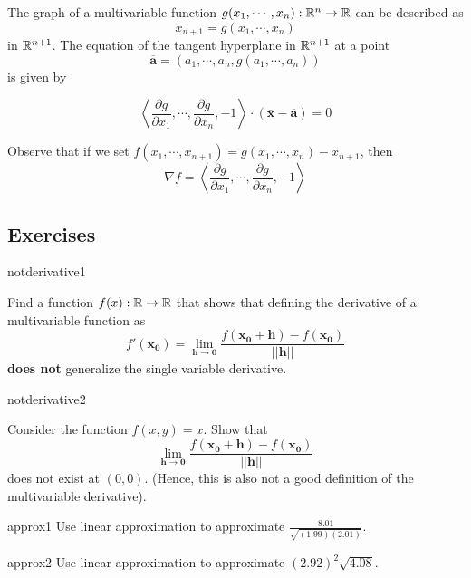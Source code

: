     \begin{theorem}
    The graph of a multivariable function $g(x_1, \cdots, x_n) : \mathbb{R}^n \to \mathbb{R}$ can be described as $$x_{n+1} = g(x_1, \cdots, x_n)$$ in $\mathbb{R}^{n+1}$.  The equation of the tangent hyperplane in $\mathbb{R}^{n+1}$ at a point $$\bm{\overline{a}} = (a_1, \cdots, a_n, g(a_1, \cdots, a_n))$$ is given by 
    
    
    $$\left\langle \frac{\partial g}{\partial x_1}, \cdots, \frac{\partial g}{\partial x_n}, -1 \right\rangle \cdot (\bm{\overline{x}} - \bm{\overline{a}}) = 0$$
    \end{theorem}

    Observe that if we set $f(x_1, \cdots, x_{n+1}) = g(x_1, \cdots, x_n) - x_{n+1}$, then $$\nabla f = \left\langle \frac{\partial g}{\partial x_1}, \cdots, \frac{\partial g}{\partial x_n}, -1 \right\rangle$$

\subsection{Exercises}



\begin{problem}{notderivative1}


    Find a function $f(x) : \mathbb{R} \to \mathbb{R}$ that shows that defining the derivative of a multivariable function as 
    $$f'(\bm{x_0}) = \lim_{\bm{h} \to \bm{0}} \frac{f(\bm{x_0+h})-f(\bm{x_0})}{||\bm{h}||}$$ \textbf{does not} generalize the single variable derivative.


    
\end{problem}

\begin{problem}{notderivative2}

    Consider the function $f(x,y) = x$.  Show that  $$\lim_{\bm{h} \to \bm{0}} \frac{f(\bm{x_0+h})-f(\bm{x_0})}{||\bm{h}||}$$ does not exist at $(0,0)$.  (Hence, this is also not a good definition of the multivariable derivative).
    
\end{problem}


\begin{problem}{approx1}
    Use linear approximation to approximate $\frac{8.01}{\sqrt{(1.99)(2.01)}}$.
\end{problem}

\begin{problem}{approx2}
    Use linear approximation to approximate $(2.92)^2\sqrt{4.08}$.
\end{problem}

